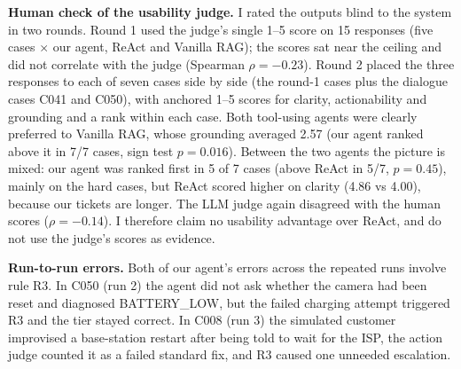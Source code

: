 \documentclass[12pt,a4paper]{article}
\begin{document}
\textbf{Human check of the usability judge.} I rated the outputs blind to the system in two rounds. Round 1
used the judge's single 1--5 score on 15 responses (five cases $\times$ our agent, ReAct and Vanilla RAG); the scores
sat near the ceiling and did not correlate with the judge (Spearman $\rho=-0.23$). Round 2 placed the three responses
to each of seven cases side by side (the round-1 cases plus the dialogue cases C041 and C050), with anchored 1--5
scores for clarity, actionability and grounding and a rank within each case. Both tool-using agents were clearly
preferred to Vanilla RAG, whose grounding averaged 2.57 (our agent ranked above it in 7/7 cases, sign test
$p=0.016$). Between the two agents the picture is mixed: our agent was ranked first in 5 of 7 cases (above ReAct in
5/7, $p=0.45$), mainly on the hard cases, but ReAct scored higher on clarity (4.86 vs 4.00), because our tickets are
longer. The LLM judge again disagreed with the human scores ($\rho=-0.14$). I therefore claim no usability advantage
over ReAct, and do not use the judge's scores as evidence.

\textbf{Run-to-run errors.} Both of our agent's errors across the repeated runs involve rule R3. In C050 (run 2) the
agent did not ask whether the camera had been reset and diagnosed BATTERY\_LOW, but the failed charging attempt
triggered R3 and the tier stayed correct. In C008 (run 3) the
simulated customer improvised a base-station restart after being told to wait for the ISP, the action judge counted
it as a failed standard fix, and R3 caused one unneeded escalation.

\begin{table}[t]
\centering\small
\caption{Ablations (run 1). Repeats: identical console queries/questions per case blocked by memory / actually executed.}\label{tab:abl}
\setlength{\tabcolsep}{3.5pt}
\end{table}
\end{document}
